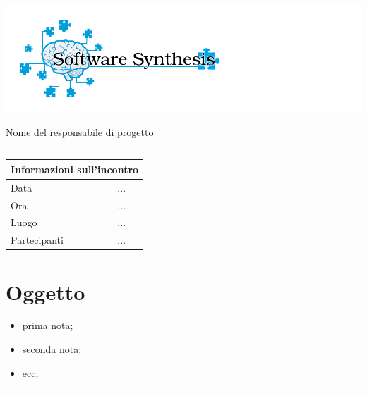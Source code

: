 \documentclass[a4paper,10pt,openright]{article}
\begin{document}
\includegraphics[width=1.5\textwidth]{logo}

\begin{center}

\begin{Large}
\hspace{1.2cm}{Verbale d'incontro 2012/12/10}
\newline
\end{Large}

\begin{small}
	Nome del responsabile di progetto
\end{small}

\noindent\rule{\textwidth}{0.4pt}
\newline

\begin{tabular}{ll}
\toprule
\multicolumn{2}{c}{\sffamily Informazioni sull'incontro}\\
\midrule
Data & ... \\
Ora & ... \\
Luogo & ... \\
Partecipanti & ... \\
\bottomrule
\end{tabular}

\end{center}

\section*{Oggetto}
\begin{itemize}
	\item prima nota;
	\item seconda nota;
	\item ecc;
\end{itemize}
\noindent\rule{\textwidth}{0.4pt}
\end{document}
